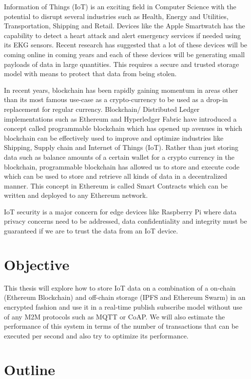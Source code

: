 \documentclass[11pt,openright]{report}
\begin{document}
Information of Things (IoT) is an exciting field in Computer Science with the potential to disrupt several industries such as Health, Energy and Utilities, Transportation, Shipping and Retail. Devices like the Apple Smartwatch has the capability to detect a heart attack and alert emergency services if needed using its EKG sensors. Recent research has suggested that a lot of these devices will be coming online in coming years and each of these devices will be generating small payloads of data in large quantities. This requires a secure and trusted storage model with means to protect that data from being stolen. 

In recent years, blockchain has been rapidly gaining momentum in areas other than its most famous use-case as a crypto-currency to be used as a drop-in replacement for regular currency. Blockchain/ Distributed Ledger implementations such as Ethereum and Hyperledger Fabric have introduced a concept called programmable blockchain which has opened up avenues in which blockchain can be effectively used to improve and optimize industries like Shipping, Supply chain and Internet of Things (IoT). Rather than just storing data such as balance amounts of a certain wallet for a crypto currency in the blockchain, programmable blockchain has allowed us to store and execute code which can be used to store and retrieve all kinds of data in a decentralized manner. This concept in Ethereum is called Smart Contracts which can be written and deployed to any Ethereum network.

IoT security is a major concern for edge devices like Raspberry Pi where data privacy concerns need to be addressed, data confidentiality and integrity must be guaranteed if we are to trust the data from an IoT device. 

\section{Objective}\label{section:objective}
This thesis will explore how to store IoT data on a combination of a on-chain (Ethereum Blockchain) and off-chain storage (IPFS and Ethereum Swarm) in an encrypted fashion and use it in a real-time publish subscribe model without use of any M2M protocols such as MQTT or CoAP. We will also estimate the performance of this system in terms of the number of transactions that can be executed per second and also try to optimize its performance.

\section{Outline}\label{section:outline}
\end{document}
